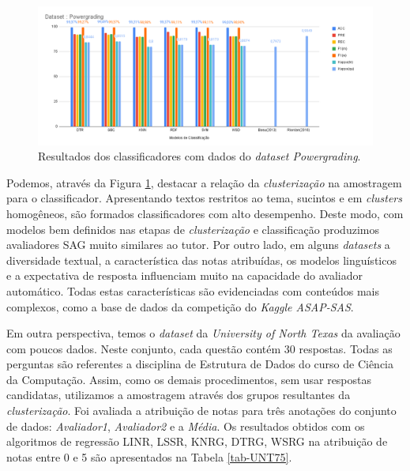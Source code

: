 \begin{figure}[!h]
\centering
\includegraphics[width=\textwidth]{figuras/Powergrading-75}
\caption{Resultados dos classificadores com dados do \textit{dataset Powergrading}.}
\label{fig-PG75}
\end{figure}

Podemos, através da Figura \ref{fig-PG75}, destacar a relação da \textit{clusterização} na amostragem para o classificador. Apresentando textos restritos ao tema, sucintos e em \textit{clusters} homogêneos, são formados classificadores com alto desempenho. Deste modo, com modelos bem definidos nas etapas de \textit{clusterização} e classificação produzimos avaliadores SAG muito similares ao tutor. Por outro lado, em alguns \textit{datasets} a diversidade textual, a característica das notas atribuídas, os modelos linguísticos e a expectativa de resposta influenciam muito na capacidade do avaliador automático. Todas estas características são evidenciadas com conteúdos mais complexos, como a base de dados da competição do \textit{Kaggle ASAP-SAS}.

Em outra perspectiva, temos o \textit{dataset} da \textit{University of North Texas} da avaliação com poucos dados. Neste conjunto, cada questão contém 30 respostas. Todas as perguntas são referentes a disciplina de Estrutura de Dados do curso de Ciência da Computação. Assim, como os demais procedimentos, sem usar respostas candidatas, utilizamos a amostragem através dos grupos resultantes da \textit{clusterização}. Foi avaliada a atribuição de notas para três anotações do conjunto de dados: \textit{Avaliador1}, \textit{Avaliador2} e a \textit{Média}. Os resultados obtidos com os algoritmos de regressão LINR, LSSR, KNRG, DTRG, WSRG na atribuição de notas entre 0 e 5 são apresentados na Tabela \ref{tab-UNT75}.

